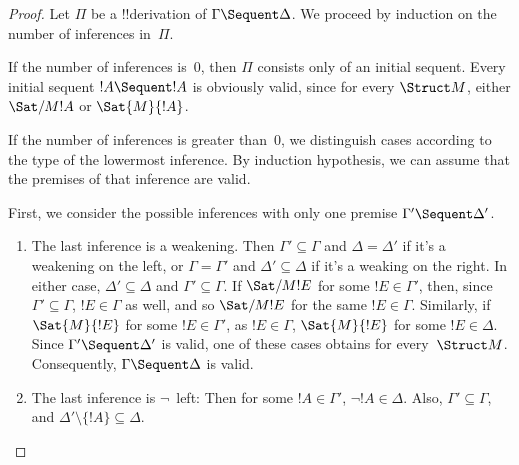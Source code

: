 \documentclass[../../include/open-logic-section]{subfiles}
\begin{document}
\begin{proof}
Let $\Pi$ be a !!{derivation} of $\Gamma \Sequent \Delta$. We proceed by
induction on the number of inferences in~$\Pi$.

If the number of inferences is~0, then $\Pi$ consists only of an
initial sequent. Every initial sequent $!A \Sequent !A$ is obviously
valid, since for every $\Struct M$, either $\Sat/{M}{!A}$ or
$\Sat{M}{!A}$.

If the number of inferences is greater than~0, we distinguish cases
according to the type of the lowermost inference. By induction
hypothesis, we can assume that the premises of that inference are
valid.

First, we consider the possible inferences with only one premise
$\Gamma' \Sequent \Delta'$.
\begin{enumerate}
\item The last inference is a weakening. Then $\Gamma' \subseteq
  \Gamma$ and $\Delta = \Delta'$ if it's a weakening on the left, or
  $\Gamma = \Gamma'$ and $\Delta' \subseteq \Delta$ if it's a weaking
  on the right.  In either case, $\Delta' \subseteq \Delta$ and
  $\Gamma' \subseteq \Gamma$.  If $\Sat/{M}{!E}$ for some $!E \in
  \Gamma'$, then, since $\Gamma' \subseteq \Gamma$, $!E \in \Gamma$ as
  well, and so $\Sat/{M}{!E}$ for the same $!E \in \Gamma$. Similarly,
  if $\Sat{M}{!E}$ for some $!E \in \Gamma'$, as $!E \in \Gamma$,
  $\Sat{M}{!E}$ for some $!E \in \Delta$. Since $\Gamma' \Sequent
  \Delta'$ is valid, one of these cases obtains for every~$\Struct
  M$. Consequently, $\Gamma \Sequent \Delta$ is valid.
\item The last inference is $\lnot$~left: Then for some $!A \in
  \Gamma'$, $\lnot !A \in \Delta$.  Also, $\Gamma' \subseteq \Gamma$,
  and $\Delta' \setminus \{!A\} \subseteq \Delta$. 


\end{enumerate}
\end{proof}
\end{document}
